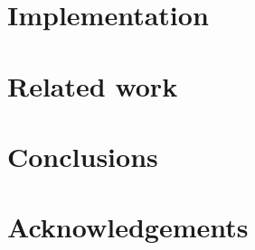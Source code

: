 \documentclass{llncs}
\begin{document}
\section{Implementation}
\label{implementation}


\section{Related work}
\label{related}


%

\section{Conclusions}
\label{conclusions}


\section{Acknowledgements}
\label{ack}




\end{document}
